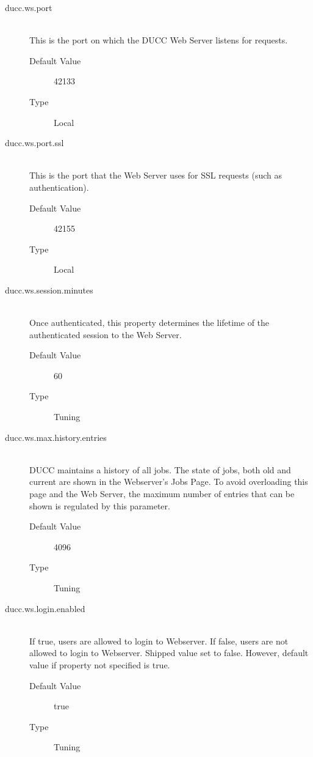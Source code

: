 \begin{description}
        \item[ducc.ws.port] \hfill \\
          This is the port on which the DUCC Web Server listens for requests. 
          \begin{description}
            \item[Default Value] 42133 
            \item[Type] Local 
          \end{description}

        \item[ducc.ws.port.ssl] \hfill \\
          This is the port that the Web Server uses for SSL requests (such as authentication). 
          \begin{description}
            \item[Default Value] 42155 
            \item[Type] Local 
          \end{description}
                    
        \item[ducc.ws.session.minutes] \hfill \\
          Once authenticated, this property determines the lifetime of the authenticated session to the 
          Web Server. 
          \begin{description}
            \item[Default Value] 60 
            \item[Type] Tuning
          \end{description}

        \item[ducc.ws.max.history.entries] \hfill \\
          DUCC maintains a history of all jobs.  The state of jobs, both old and current are shown
          in the Webserver's Jobs Page.  To avoid overloading this page and the Web Server, the maximum
          number of entries that can be shown is regulated by this parameter.
          \begin{description}
            \item[Default Value] 4096
            \item[Type] Tuning
          \end{description}

        \item[ducc.ws.login.enabled] \hfill \\
          If true, users are allowed to login to Webserver.  If false, users are
          not allowed to login to Webserver.  Shipped value set to false. 
          However, default value if property not specified is true.
          \begin{description}
            \item[Default Value] true
            \item[Type] Tuning
          \end{description}
        

\end{description}

